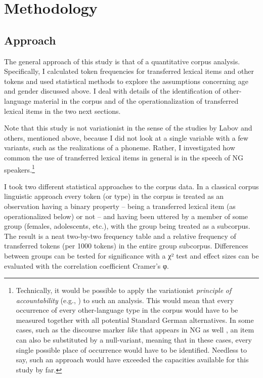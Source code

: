 \documentclass[output=paper]{langsci/langscibook}
\begin{document}
 
\section{Methodology}\largerpage[2]
\label{sec:bracke:4}
 
   
\subsection{Approach}
\label{sec:bracke:4.1}
The general approach of this study is that of a quantitative corpus analysis. Specifically, I calculated token frequencies for transferred lexical items and other tokens and used statistical methods to explore the assumptions concerning age and gender discussed above. I deal with details of the identification of other-language material in the corpus and of the operationalization of transferred lexical items in the two next sections.

Note that this study is not variationist in the sense of the studies by Labov and others, mentioned above, because I did not look at a single variable with a few variants, such as the realizations of a phoneme. Rather, I investigated how common the use of transferred lexical items in general is in the speech of NG speakers.\footnote{Technically, it would be possible to apply the variationist \textit{principle} \textit{of} \textit{accountability} (e.g., \citealt[9]{tagliamonte_variationist_2012}) to such an analysis. This would mean that every occurrence of every other-language type in the corpus would have to be measured together with all potential Standard German alternatives. In some cases, such as the discourse marker \textit{like} \citep[270]{tagliamonte_variationist_2012} that appears in NG as well \citep[299--300]{wiese_deutsch_2014}, an item can also be substituted by a null-variant, meaning that in these cases, every single possible place of occurrence would have to be identified. Needless to say, such an approach would have exceeded the capacities available for this study by far.}

I took two different statistical approaches to the corpus data. In a classical corpus linguistic approach every token (or type) in the corpus is treated as an observation having a binary property – being a transferred lexical item (as operationalized below) or not – and having been uttered by a member of some group (females, adolescents, etc.), with the group being treated as a subcorpus. The result is a neat two-by-two frequency table and a relative frequency of transferred tokens (per 1000 tokens) in the entire group subcorpus. Differences between groups can be tested for significance with a χ² test and effect sizes can be evaluated with the correlation coefficient Cramer’s φ.
\end{document}
